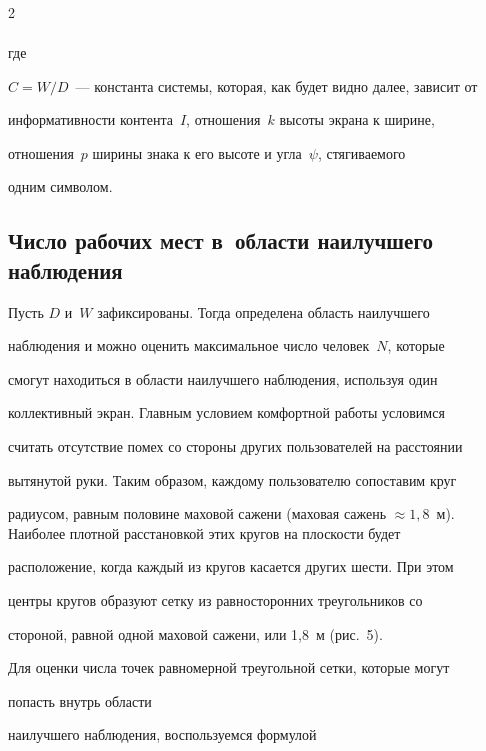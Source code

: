 \begin{multicols}{2}
\begin{multline}
\label{e5chu}


\end{multline}


где


$C=W/D$~--- константа системы, которая, как будет видно далее, зависит от 


информативности контента~$I$, отношения~$k$ высоты экрана к ширине, 


отношения~$p$ ширины знака к его высоте и угла~$\psi$, стягиваемого 


одним символом.





\subsection{Число рабочих мест в~области наилучшего наблюдения} %





Пусть $D$ и~$W$ зафиксированы. Тогда определена область наилучшего 


наблюдения и можно оценить максимальное число человек~$N$, которые 


смогут находиться в области наилучшего наблюдения, используя один 


коллективный экран. Главным условием комфортной работы условимся 


считать отсутствие помех со стороны других пользователей на расстоянии 


вытянутой руки. Таким образом, каждому пользователю сопоставим круг 


радиусом, равным половине маховой сажени (маховая сажень $\approx 


1{,}8$~м). Наиболее плотной расстановкой этих кругов на плоскости будет 


расположение, когда каж\-дый из кругов касается других шести. При этом 


центры кругов образуют сетку из равносторонних треугольников со 


стороной, равной одной маховой сажени, или 1,8~м (рис.~5).








Для оценки числа точек равномерной треугольной сетки, которые могут 


попасть внутрь области


 наилучшего наблюдения, воспользуемся формулой



\end{multicols}
